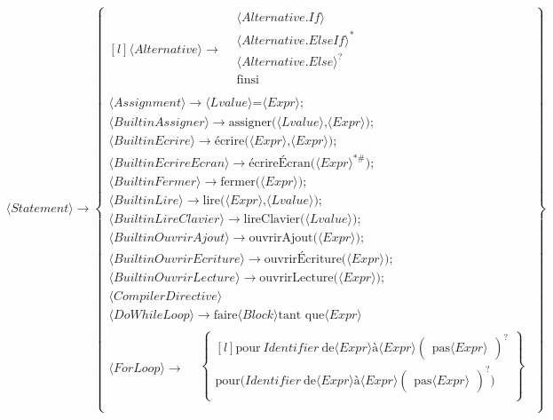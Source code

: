 \begin{align*}
&⟨Statement⟩ \to \begin{Bmatrix*}[l]
    ⟨Alternative⟩ \to \begin{split}
    &   ⟨Alternative.If⟩ \\
    &   ⟨Alternative.ElseIf⟩^* \\
    &   ⟨Alternative.Else⟩^? \\
    &   \text{finsi} \\
    \end{split} \\
    ⟨Assignment⟩ \to ⟨Lvalue⟩\text{=}⟨Expr⟩\text{;} \\
    ⟨BuiltinAssigner⟩ \to \text{assigner}\text{(}⟨Lvalue⟩\text{,}⟨Expr⟩\text{)}\text{;} \\
    ⟨BuiltinEcrire⟩ \to \text{écrire}\text{(}⟨Expr⟩\text{,}⟨Expr⟩\text{)}\text{;} \\
    ⟨BuiltinEcrireEcran⟩ \to \text{écrireÉcran}\text{(}⟨Expr⟩^{*\#}\text{)}\text{;} \\
    ⟨BuiltinFermer⟩ \to \text{fermer}\text{(}⟨Expr⟩\text{)}\text{;} \\
    ⟨BuiltinLire⟩ \to \text{lire}\text{(}⟨Expr⟩\text{,}⟨Lvalue⟩\text{)}\text{;} \\
    ⟨BuiltinLireClavier⟩ \to \text{lireClavier}\text{(}⟨Lvalue⟩\text{)}\text{;} \\
    ⟨BuiltinOuvrirAjout⟩ \to \text{ouvrirAjout}\text{(}⟨Expr⟩\text{)}\text{;} \\
    ⟨BuiltinOuvrirEcriture⟩ \to \text{ouvrirÉcriture}\text{(}⟨Expr⟩\text{)}\text{;} \\
    ⟨BuiltinOuvrirLecture⟩ \to \text{ouvrirLecture}\text{(}⟨Expr⟩\text{)}\text{;} \\
    ⟨CompilerDirective⟩\\
    ⟨DoWhileLoop⟩ \to \text{faire} ⟨Block⟩ \text{tant\ que} ⟨Expr⟩ \\
    ⟨ForLoop⟩ \to \begin{split}
    &   \begin{Bmatrix*}[l]
            \text{pour}\ Identifier\ \text{de} ⟨Expr⟩ \text{à} ⟨Expr⟩ \begin{pmatrix}\text{pas} ⟨Expr⟩\end{pmatrix}^? \\
            \text{pour}\text{(}Identifier\ \text{de} ⟨Expr⟩ \text{à} ⟨Expr⟩ \begin{pmatrix}\text{pas} ⟨Expr⟩\end{pmatrix}^?\text{)} \\
        \end{Bmatrix*} \\

\end{split}
\end{Bmatrix*}
\end{align*}
